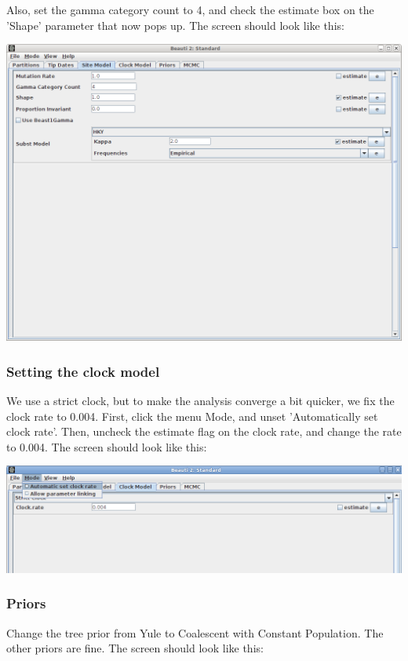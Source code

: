 \documentclass{article}
\begin{document}
Also, set the gamma category count to 4, and check the estimate box on the 'Shape' parameter that now pops up.
The screen should look like this:

\includegraphics[scale=0.4,clip=true,trim=0 300 0 0]{figures/BEAUti_sitemodel.png}

\subsubsection*{Setting the clock model}

We use a strict clock, but to make the analysis converge a bit quicker, we fix the clock rate to 0.004.
First, click the menu Mode, and unset 'Automatically set clock rate'. Then, uncheck the estimate flag on the clock rate, and change the rate to 0.004.
The screen should look like this:

\includegraphics[scale=0.4,clip=true,trim=0 300 0 0]{figures/BEAUti_clockmodel.png}


\subsubsection*{Priors}

Change the tree prior from Yule to Coalescent with Constant Population. The other priors are fine. The screen should look like this:
\end{document}

